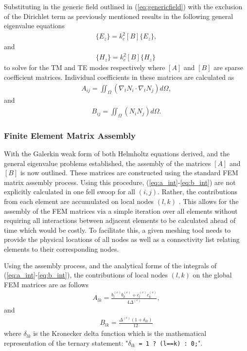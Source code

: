 Substituting in the generic field outlined in (\ref{eq:genericfield}) with the exclusion of the Dirichlet term as previously mentioned results in the following general eigenvalue equations
\begin{align}
	[A]\{E_z\}=k^2_c[B]\{E_z\},
	\label{eq:tm_eig}
\end{align}
and
\begin{align}
	[A]\{H_z\}=k^2_c[B]\{H_z\}\
	\label{eq:te_eig}
\end{align}
to solve for the TM and TE modes respectively where $[A]$ and $[B]$ are sparse coefficient matrices. Individual coefficients in these matrices are calculated as
\begin{align}
	A_{ij}=\iint_\Omega\left(\nabla_tN_i\cdot\nabla_tN_j\right)d\Omega,
	\label{eq:a_int}
\end{align}
and
\begin{align}
	B_{ij}=\iint_\Omega\left(N_i N_j\right)d\Omega.
	\label{eq:b_int}
\end{align}

\subsubsection{Finite Element Matrix Assembly}
\label{subsub:mat_assembly}
With the Galerkin weak form of both Helmholtz equations derived, and the general eigenvalue problems established, the assembly of the matrices $[A]$ and $[B]$ is now outlined. These matrices are constructed using the standard FEM matrix assembly process. Using this procedure, (\ref{eq:a_int}-\ref{eq:b_int}) are not explicitly calculated in one fell swoop for all $(i,j)$. Rather, the contributions from each element are accumulated on local nodes $(l,k)$ \cite{jin2011theory}. This allows for the assembly of the FEM matrices via a simple iteration over all elements without requiring all interactions between adjacent elements to be calculated ahead of time which would be costly. To facilitate this, a given meshing tool needs to provide the physical locations of all nodes as well as a connectivity list relating elements to their corresponding nodes.

Using the assembly process, and the analytical forms of the integrals of (\ref{eq:a_int}-\ref{eq:b_int}), the contributions of local nodes $(l,k)$ on the global FEM matrices are as follows
\begin{align}
	A_{lk}=\frac{b_l^{(e)}b_k^{(e)}+c_l^{(e)}c_k^{(e)}}{4\Delta^{(e)}},
	\label{eq:a_fin}
\end{align}
and
\begin{align}
	B_{lk}=\frac{\Delta^{(e)}(1+\delta_{lk})}{12}
	\label{eq:b_fin}
\end{align}
\cite{jin2011theory} where $\delta_{lk}$ is the Kronecker delta function which is the mathematical representation of the ternary statement: "$\delta_{lk} $\verb| = 1 ? (l==k) : 0;|".

